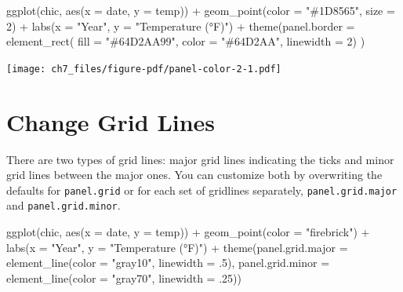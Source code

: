 \documentclass[
  letterpaper,
  DIV=11,
  numbers=noendperiod]{scrreprt}
\newenvironment{Shaded}{\begin{snugshade}}{\end{snugshade}}
\newcommand{\AttributeTok}[1]{\textcolor[rgb]{0.40,0.45,0.13}{#1}}
\newcommand{\DecValTok}[1]{\textcolor[rgb]{0.68,0.00,0.00}{#1}}
\newcommand{\FunctionTok}[1]{\textcolor[rgb]{0.28,0.35,0.67}{#1}}
\newcommand{\NormalTok}[1]{\textcolor[rgb]{0.00,0.23,0.31}{#1}}
\newcommand{\SpecialCharTok}[1]{\textcolor[rgb]{0.37,0.37,0.37}{#1}}
\newcommand{\StringTok}[1]{\textcolor[rgb]{0.13,0.47,0.30}{#1}}
\begin{document}
\begin{Shaded}
\begin{Highlighting}[]
\FunctionTok{ggplot}\NormalTok{(chic, }\FunctionTok{aes}\NormalTok{(}\AttributeTok{x =}\NormalTok{ date, }\AttributeTok{y =}\NormalTok{ temp)) }\SpecialCharTok{+}
  \FunctionTok{geom\_point}\NormalTok{(}\AttributeTok{color =} \StringTok{"\#1D8565"}\NormalTok{, }\AttributeTok{size =} \DecValTok{2}\NormalTok{) }\SpecialCharTok{+}
  \FunctionTok{labs}\NormalTok{(}\AttributeTok{x =} \StringTok{"Year"}\NormalTok{, }\AttributeTok{y =} \StringTok{"Temperature (°F)"}\NormalTok{) }\SpecialCharTok{+}
  \FunctionTok{theme}\NormalTok{(}\AttributeTok{panel.border =} \FunctionTok{element\_rect}\NormalTok{(}
    \AttributeTok{fill =} \StringTok{"\#64D2AA99"}\NormalTok{, }\AttributeTok{color =} \StringTok{"\#64D2AA"}\NormalTok{, }\AttributeTok{linewidth =} \DecValTok{2}\NormalTok{)}
\NormalTok{  )}
\end{Highlighting}
\end{Shaded}

\texttt{[image: ch7\_files/figure-pdf/panel-color-2-1.pdf]}

\section{Change Grid Lines}\label{change-grid-lines}

There are two types of grid lines: major grid lines indicating the ticks
and minor grid lines between the major ones. You can customize both by
overwriting the defaults for \texttt{panel.grid} or for each set of
gridlines separately, \texttt{panel.grid.major} and
\texttt{panel.grid.minor}.

\begin{Shaded}
\begin{Highlighting}[]
\FunctionTok{ggplot}\NormalTok{(chic, }\FunctionTok{aes}\NormalTok{(}\AttributeTok{x =}\NormalTok{ date, }\AttributeTok{y =}\NormalTok{ temp)) }\SpecialCharTok{+}
  \FunctionTok{geom\_point}\NormalTok{(}\AttributeTok{color =} \StringTok{"firebrick"}\NormalTok{) }\SpecialCharTok{+}
  \FunctionTok{labs}\NormalTok{(}\AttributeTok{x =} \StringTok{"Year"}\NormalTok{, }\AttributeTok{y =} \StringTok{"Temperature (°F)"}\NormalTok{) }\SpecialCharTok{+}
  \FunctionTok{theme}\NormalTok{(}\AttributeTok{panel.grid.major =} \FunctionTok{element\_line}\NormalTok{(}\AttributeTok{color =} \StringTok{"gray10"}\NormalTok{, }\AttributeTok{linewidth =}\NormalTok{ .}\DecValTok{5}\NormalTok{),}
        \AttributeTok{panel.grid.minor =} \FunctionTok{element\_line}\NormalTok{(}\AttributeTok{color =} \StringTok{"gray70"}\NormalTok{, }\AttributeTok{linewidth =}\NormalTok{ .}\DecValTok{25}\NormalTok{))}
\end{Highlighting}
\end{Shaded}
\end{document}
